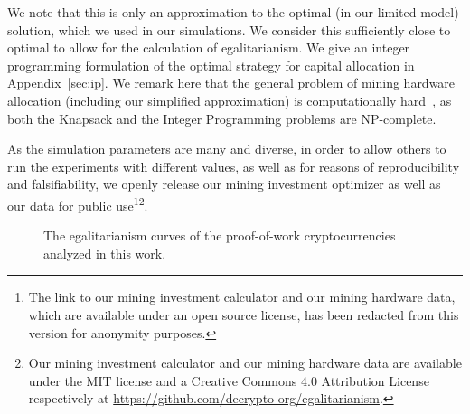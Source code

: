 We note that this is only an approximation to the optimal (in our limited model)
solution, which we used in our simulations. We consider this sufficiently close
to optimal to allow for the calculation of egalitarianism. We give an integer
programming formulation of the optimal strategy for capital allocation in
Appendix~\ref{sec:ip}. We remark here that the general problem of mining hardware
allocation (including our simplified approximation) is computationally
hard~\cite{karp1972reducibility}, as both the Knapsack and the Integer
Programming problems are NP-complete.

As the simulation parameters are many and diverse, in order to allow others to
run the experiments with different values, as well as for reasons of
reproducibility and falsifiability, we openly release our mining investment
optimizer as well as our data for public use\ifanonymous\footnote{The link to our mining investment calculator and our mining hardware data,
  which are available under an open source license, has been redacted from this
  version for anonymity purposes.
}\else\footnote{Our mining investment calculator and our mining hardware data are available
  under the MIT license and a Creative Commons 4.0 Attribution License
  respectively at \url{https://github.com/decrypto-org/egalitarianism}.
}\fi.

\begin{figure}
  \caption{The egalitarianism curves of the proof-of-work cryptocurrencies analyzed in this work.}
  \label{fig:egalitarian_curves_pow}
\end{figure}

